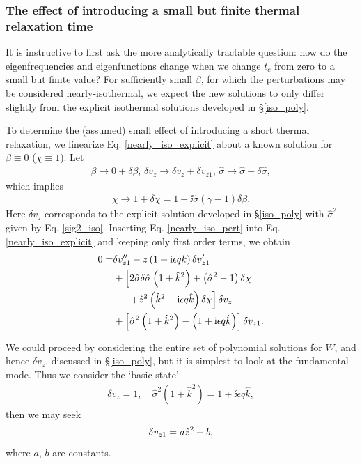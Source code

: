 \subsubsection{The effect of introducing a small but finite
  thermal relaxation time} 
It is instructive to first ask  the more analytically tractable
question: how 
do the eigenfrequencies and eigenfunctions change when we change
$t_c$ from zero to a small but finite value? For sufficiently small
$\beta$, for which the perturbations may be considered 
nearly-isothermal, we expect the new solutions to only differ slightly
from the explicit isothermal solutions developed in \S\ref{iso_poly}. 


To determine the (assumed) small effect of introducing a short thermal
relaxation, we linearize Eq. \ref{nearly_iso_explicit} about a known 
solution for $\beta\equiv0$  ($\chi\equiv 1$). 
Let 
\begin{align}\label{nearly_iso_pert}
  \beta \to 0 + \delta\beta,\, \delta v_z\to \delta v_z+\delta
  v_{z1},\,\hat{\sigma} \to \hat{\sigma} + \delta\hat{\sigma}, 
\end{align}
which implies 
\begin{align}
  \chi \to 1 + \delta\chi = 1 + \ii \hat{\sigma}\left(\gamma-1\right)\delta\beta.
\end{align}
Here $\delta v_z$ corresponds to the explicit solution developed in
\S\ref{iso_poly} with  $\hat{\sigma}^2$ given by Eq. \ref{sig2_iso}. Inserting
Eq. \ref{nearly_iso_pert} into Eq. \ref{nearly_iso_explicit}  and keeping
only first order terms, we obtain 
\begin{align}
 0 =& \delta v_{z1}^{\prime\prime} - z\left(1 + \mathrm{i}\epsilon q
   k\right)\delta v_{z1}^\prime\notag\\
 &+ \left[2\hat{\sigma}\delta\hat{\sigma}\left(1 + \hat{k}^2\right) +
   \left(\hat{\sigma}^2 - 1\right)\delta\chi \right.\notag\\
&\phantom{++} \left. + \hat{z}^2\left(\hat{k}^2 -
     \mathrm{i}\epsilon q \hat{k}\right)\delta\chi\right]\delta v_z\notag\\
 &+\left[\hat{\sigma}^2\left(1 + \hat{k}^2\right) - \left(1+\mathrm{i}\epsilon
     q \hat{k}\right)\right]\delta v_{z1}.\label{nearly_iso4}
\end{align}

We could proceed by considering the entire set of polynomial solutions
for $W$, and hence $\delta v_z$, discussed in \S\ref{iso_poly}, but it
is simplest to look at the fundamental mode. Thus we consider the `basic state' 
 \begin{align*}
   \delta v_z = 1,\quad \hat{\sigma}^2\left(1+\hat{k}^2\right) = 1 +
   \ii\epsilon q \hat{k},
 \end{align*}
 then we may seek 
 \begin{align}
   \delta v_{z1} = a \hat{z}^2 + b,
 \end{align}
where $a$, $b$ are constants. 

